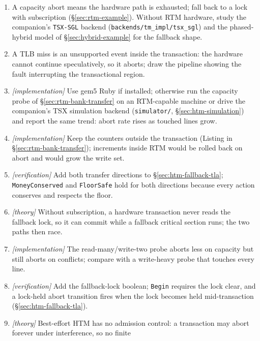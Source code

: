 \begin{enumerate}
    \item A capacity abort means the hardware path is exhausted; fall back to
          a lock with subscription (\S\ref{sec:rtm-example}).  Without RTM
          hardware, study the companion's \texttt{TSX-SGL} backend
          (\texttt{backends/tm\_impl/tsx\_sgl}) and the phased-hybrid model
          of \S\ref{sec:hybrid-example} for the fallback shape.
    \item A TLB miss is an unsupported event inside the transaction: the
          hardware cannot continue speculatively, so it aborts; draw the
          pipeline showing the fault interrupting the transactional region.
    \item \emph{[implementation]} Use gem5 Ruby if installed; otherwise run
          the capacity probe of \S\ref{sec:rtm-bank-transfer} on an
          RTM-capable machine or drive the companion's TSX simulation
          backend (\texttt{simulator/}, \S\ref{sec:htm-simulation}) and
          report the same trend: abort rate rises as touched lines grow.
    \item \emph{[implementation]} Keep the counters outside the transaction
          (Listing in \S\ref{sec:rtm-bank-transfer}); increments inside RTM
          would be rolled back on abort and would grow the write set.
    \item \emph{[verification]} Add both transfer directions to
          \S\ref{sec:htm-fallback-tla}; \texttt{MoneyConserved} and
          \texttt{FloorSafe} hold for both directions because every action
          conserves and respects the floor.
    \item \emph{[theory]} Without subscription, a hardware transaction never
          reads the fallback lock, so it can commit while a fallback
          critical section runs; the two paths then race.
    \item \emph{[implementation]} The read-many/write-two probe aborts less
          on capacity but still aborts on conflicts; compare with a
          write-heavy probe that touches every line.
    \item \emph{[verification]} Add the fallback-lock boolean; \texttt{Begin}
          requires the lock clear, and a lock-held abort transition fires
          when the lock becomes held mid-transaction
          (\S\ref{sec:htm-fallback-tla}).
    \item \emph{[theory]} Best-effort HTM has no admission control: a
          transaction may abort forever under interference, so no finite

\end{enumerate}
